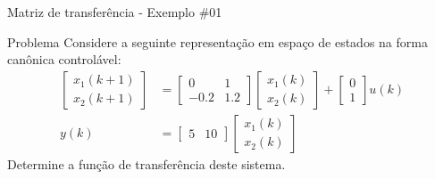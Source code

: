 \begin{frame}{Matriz de transferência - Exemplo \#01}
\begin{block}{Problema}
Considere a seguinte representação em espaço de estados na forma canônica controlável:
\begin{align*}
    \begin{bmatrix} x_1(k+1) \\ x_2(k+1) \end{bmatrix}
    &=
    \begin{bmatrix}
    0 & 1 \\ -\num{0,2} & \num{1,2}
    \end{bmatrix}
    \begin{bmatrix}
    x_1(k) \\ x_2(k)
    \end{bmatrix}
    +
    \begin{bmatrix}
    0 \\ 1
    \end{bmatrix}
    u(k) \\
    y(k)
    &=
    \begin{bmatrix}
    5 & 10
    \end{bmatrix}
    \begin{bmatrix}
    x_1(k) \\ x_2(k)
    \end{bmatrix}
\end{align*}
Determine a função de transferência deste sistema.
\end{block}
\end{frame}

